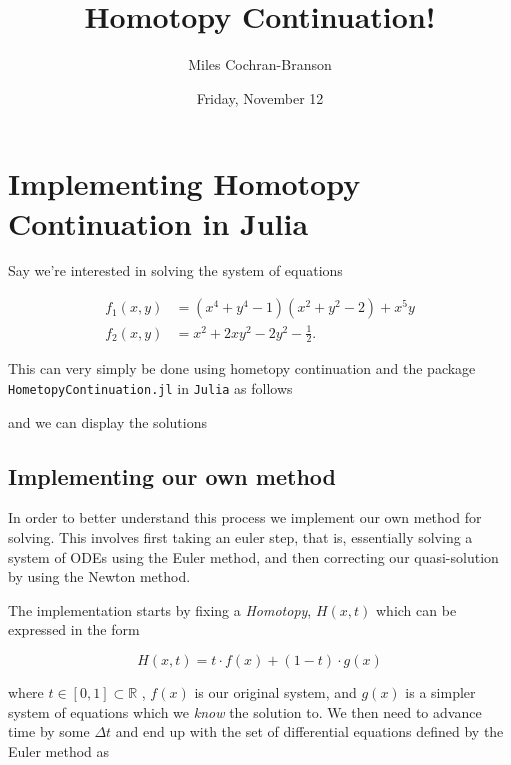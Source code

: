 \documentclass[11pt]{article}
\title{Homotopy Continuation!}
\author{Miles Cochran-Branson}
\date{Friday, November 12}
\begin{document}
    
\maketitle
  
\tableofcontents
    
    \hypertarget{implementing-homotopy-continuation-in-julia}{%
\section{Implementing Homotopy Continuation in
Julia}\label{implementing-homotopy-continuation-in-julia}}

Say we're interested in solving the system of equations

\[
\begin{split}
f_1(x, y) & = (x^4 + y^4 − 1)(x^2 + y^2 − 2) + x^5y \\
f_2(x, y) & = x^2 + 2xy^2 - 2y^2 - \frac{1}{2}. 
\end{split}
\]

This can very simply be done using hometopy continuation and the package
\texttt{HometopyContinuation.jl} in \texttt{Julia} as follows


        
    and we can display the solutions



    \hypertarget{implementing-our-own-method}{%
\subsection{Implementing our own
method}\label{implementing-our-own-method}}

In order to better understand this process we implement our own method
for solving. This involves first taking an euler step, that is,
essentially solving a system of ODEs using the Euler method, and then
correcting our quasi-solution by using the Newton method.

The implementation starts by fixing a \emph{Homotopy}, \(H(x,t)\) which
can be expressed in the form

\[
    H(x,t) = t \cdot f(x) + (1 - t) \cdot g(x)
\]

where \(t \in [0,1] \subset \mathbb{R}\) , \(f(x)\) is our original
system, and \(g(x)\) is a simpler system of equations which we
\emph{know} the solution to. We then need to advance time by some
\(\Delta t\) and end up with the set of differential equations defined
by the Euler method as
\end{document}

